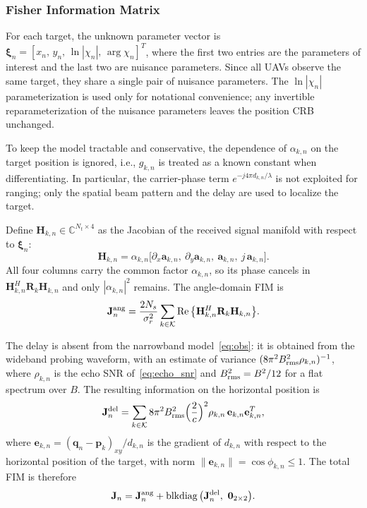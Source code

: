 \documentclass[conference]{IEEEtran}
\begin{document}
\subsubsection{Fisher Information Matrix}

For each target, the unknown parameter vector is $\boldsymbol\xi_n=[x_n,\,y_n,\,\ln|\chi_n|,\,\arg\chi_n]^T$, where the first two entries are the parameters of interest and the last two are nuisance parameters. Since all UAVs observe the same target, they share a single pair of nuisance parameters. The $\ln|\chi_n|$ parameterization is used only for notational convenience; any invertible reparameterization of the nuisance parameters leaves the position CRB unchanged.

To keep the model tractable and conservative, the dependence of $\alpha_{k,n}$ on the target position is ignored, i.e., $g_{k,n}$ is treated as a known constant when differentiating. In particular, the carrier-phase term $e^{-j4\pi d_{k,n}/\lambda}$ is not exploited for ranging; only the spatial beam pattern and the delay are used to localize the target.

Define $\mathbf H_{k,n}\in\mathbb C^{N_t\times4}$ as the Jacobian of the received signal manifold with respect to $\boldsymbol\xi_n$:
\begin{equation}\label{eq:jacobian}
\mathbf H_{k,n}=\alpha_{k,n}\big[\partial_x\mathbf a_{k,n},\ \partial_y\mathbf a_{k,n},\ \mathbf a_{k,n},\ j\,\mathbf a_{k,n}\big].
\end{equation}
All four columns carry the common factor $\alpha_{k,n}$, so its phase cancels in $\mathbf H_{k,n}^H\mathbf R_k\mathbf H_{k,n}$ and only $|\alpha_{k,n}|^2$ remains. The angle-domain FIM is
\begin{equation}\label{eq:fim_ang}
\mathbf J^{\rm ang}_n=\frac{2N_s}{\sigma_r^2}\sum_{k\in\mathcal K}\operatorname{Re}\big\{\mathbf H_{k,n}^H\mathbf R_k\mathbf H_{k,n}\big\}.
\end{equation}

The delay is absent from the narrowband model~\eqref{eq:obs}: it is obtained from the wideband probing waveform, with an estimate of variance $(8\pi^2B_{\rm rms}^2\rho_{k,n})^{-1}$, where $\rho_{k,n}$ is the echo SNR of~\eqref{eq:echo_snr} and $B_{\rm rms}^2=B^2/12$ for a flat spectrum over $B$. The resulting information on the horizontal position is
\begin{equation}\label{eq:jdel}
\mathbf J^{\rm del}_n=\sum_{k\in\mathcal K}8\pi^2B_{\rm rms}^2\Big(\frac{2}{c}\Big)^2\rho_{k,n}\,\mathbf e_{k,n}\mathbf e_{k,n}^T,
\end{equation}
where $\mathbf e_{k,n}=(\mathbf q_n-\mathbf p_k)_{xy}/d_{k,n}$ is the gradient of $d_{k,n}$ with respect to the horizontal position of the target, with norm $\|\mathbf e_{k,n}\|=\cos\phi_{k,n}\le 1$. The total FIM is therefore
\begin{equation}\label{eq:jfim}
\mathbf J_n=\mathbf J^{\rm ang}_n+\operatorname{blkdiag}\big(\mathbf J^{\rm del}_n,\ \mathbf 0_{2\times2}\big).
\end{equation}
\end{document}
